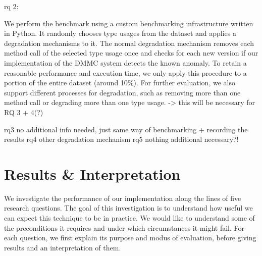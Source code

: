 
rq 2:

We perform the benchmark using a custom benchmarking infrastructure written in Python.
It randomly chooses type usages from the dataset and applies a degradation mechanisms to it.
The normal degradation mechanism removes each method call of the selected type usage once and checks for each new version if our implementation of the $\text{DMMC}$ system detects the known anomaly.
To retain a reasonable performance and execution time, we only apply this procedure to a portion of the entire dataset (around 10\%).
For further evaluation, we also support different processes for degradation, such as removing more than one method call or degrading more than one type usage.
-> this will be necessary for RQ 3 + 4(?)

rq3 no additional info needed, just same way of benchmarking + recording the results
rq4 other degradation mechanism
rq5 nothing additional necessary?!

\section{Results \& Interpretation}


We investigate the performance of our implementation along the lines of five research questions.
The goal of this investigation is to understand how useful we can expect this technique to be in practice.
We would like to understand some of the preconditions it requires and under which circumstances it might fail.
For each question, we first explain its purpose and modus of evaluation, before giving results and an interpretation of them.

